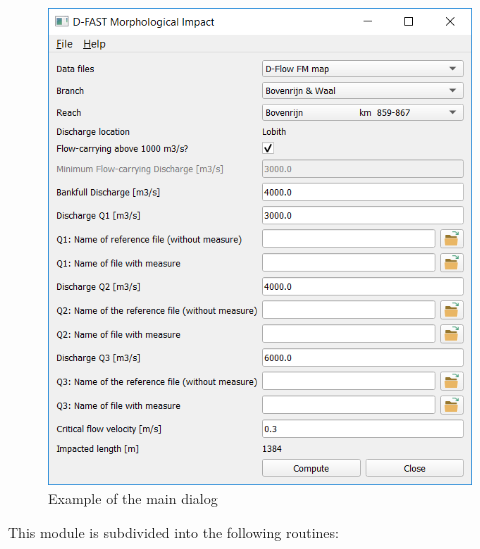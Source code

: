 \begin{figure}
\center
\includegraphics[width=12cm]{main_dialog.png}
\caption{Example of the main dialog}
\end{figure}

This module is subdivided into the following routines:

